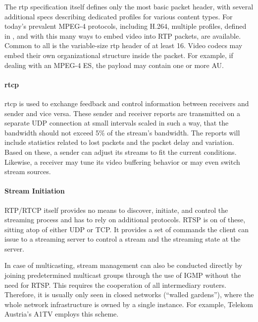 The \gls{rtp} specification itself defines only the most basic packet header, with several additional specs describing dedicated profiles for various content types. For today's prevalent MPEG-4 protocols, including H.264, multiple profiles, defined in \cite{rfc3640,rfc6184,rfc6416} , and with this many ways to embed video into RTP packets, are available. Common to all is the variable-size \gls{rtp} header of at least \SI{16}{\byte}. Video codecs may embed their own organizational structure inside the packet. For example, if dealing with an MPEG-4 \gls{ES}, the payload may contain one or more \gls{AU}.


\paragraph{\texorpdfstring{\acrshort{rtcp}}{rtcp}}

\gls{rtcp} is used to exchange feedback and control information between receivers and sender and vice versa. These sender and receiver reports are transmitted on a separate \gls{UDP} connection at small intervals scaled in such a way, that the bandwidth should not exceed 5\% of the stream's bandwidth. The reports will include statistics related to lost packets and the packet delay and variation. Based on these, a sender can adjust its streams to fit the current conditions. Likewise, a receiver may tune its video buffering behavior or may even switch stream sources.


\paragraph{Stream Initiation}

RTP/RTCP itself provides no means to discover, initiate, and control the streaming process and has to rely on additional protocols. \gls{RTSP} is on of these, sitting atop of either \gls{UDP} or \gls{TCP}. It provides a set of commands the client can issue to a streaming server to control a stream and the streaming state at the server.

In case of multicasting, stream management can also be conducted directly by joining predetermined multicast groups through the use of \gls{IGMP} \cite{rfc4604} without the need for \gls{RTSP}.
This requires the cooperation of all intermediary routers. Therefore, it is usually only seen in closed networks (``walled gardens''), where the whole network infrastructure is owned by a single instance. For example, Telekom Austria's A1TV employs this scheme. 


